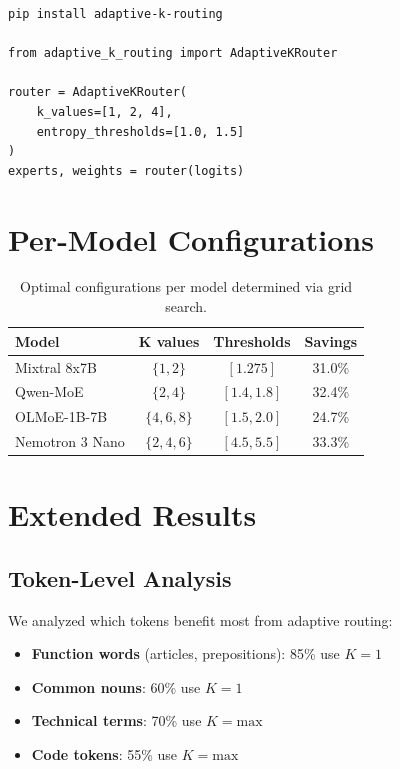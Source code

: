 \documentclass{article}
\begin{document}
\begin{verbatim}
pip install adaptive-k-routing

from adaptive_k_routing import AdaptiveKRouter

router = AdaptiveKRouter(
    k_values=[1, 2, 4],
    entropy_thresholds=[1.0, 1.5]
)
experts, weights = router(logits)
\end{verbatim}

\section{Per-Model Configurations}
\label{app:configs}

\begin{table}[h]
\centering
\caption{Optimal configurations per model determined via grid search.}
\label{tab:configs}
\begin{tabular}{@{}lccc@{}}
\toprule
\textbf{Model} & \textbf{K values} & \textbf{Thresholds} & \textbf{Savings} \\
\midrule
Mixtral 8x7B & $\{1, 2\}$ & $[1.275]$ & 31.0\% \\
Qwen-MoE & $\{2, 4\}$ & $[1.4, 1.8]$ & 32.4\% \\
OLMoE-1B-7B & $\{4, 6, 8\}$ & $[1.5, 2.0]$ & 24.7\% \\
Nemotron 3 Nano & $\{2, 4, 6\}$ & $[4.5, 5.5]$ & 33.3\% \\
\bottomrule
\end{tabular}
\end{table}

\section{Extended Results}
\label{app:extended}

\subsection{Token-Level Analysis}

We analyzed which tokens benefit most from adaptive routing:
\begin{itemize}
    \item \textbf{Function words} (articles, prepositions): 85\% use $K=1$
    \item \textbf{Common nouns}: 60\% use $K=1$
    \item \textbf{Technical terms}: 70\% use $K=\text{max}$
    \item \textbf{Code tokens}: 55\% use $K=\text{max}$
\end{itemize}
\end{document}

